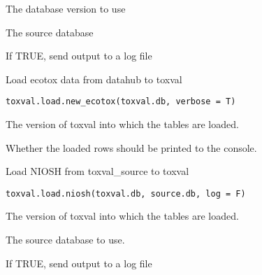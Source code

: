 \documentclass[letterpaper]{book}
\begin{document}
%
\begin{Arguments}
\begin{ldescription}
\item[\code{toxval.db}] The database version to use

\item[\code{source.db}] The source database

\item[\code{log}] If TRUE, send output to a log file
\end{ldescription}
\end{Arguments}
%
\begin{Description}\relax
Load ecotox data from datahub to toxval
\end{Description}
%
\begin{Usage}
\begin{verbatim}
toxval.load.new_ecotox(toxval.db, verbose = T)
\end{verbatim}
\end{Usage}
%
\begin{Arguments}
\begin{ldescription}
\item[\code{toxval.db}] The version of toxval into which the tables are loaded.

\item[\code{verbose}] Whether the loaded rows should be printed to the console.
\end{ldescription}
\end{Arguments}
%
\begin{Description}\relax
Load NIOSH from toxval\_source to toxval
\end{Description}
%
\begin{Usage}
\begin{verbatim}
toxval.load.niosh(toxval.db, source.db, log = F)
\end{verbatim}
\end{Usage}
%
\begin{Arguments}
\begin{ldescription}
\item[\code{toxval.db}] The version of toxval into which the tables are loaded.

\item[\code{source.db}] The source database to use.

\item[\code{log}] If TRUE, send output to a log file
\end{ldescription}
\end{Arguments}
\end{document}
